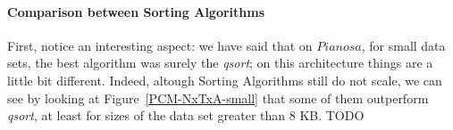 \paragraph{Comparison between Sorting Algorithms} First, notice an interesting aspect: we have said that on $Pianosa$, for small data sets, the best algorithm was surely the \textit{qsort}; on this architecture things are a little bit different. Indeed, altough Sorting Algorithms still do not scale, we can see by looking at Figure~\ref{PCM-NxTxA-small} that some of them outperform \textit{qsort}, at least for sizes of the data set greater than 8 KB. 
TODO

\begin{figure}[!ht]
	\centering
	\hspace*{20pt}	
  		
	\centering
  	\hspace*{20pt}
	

\end{figure}
